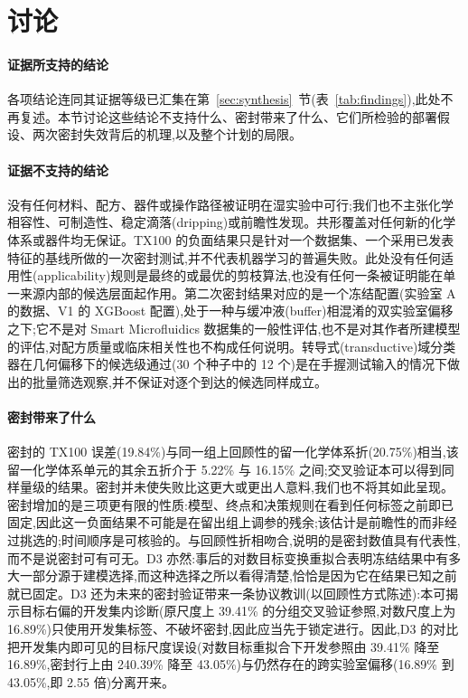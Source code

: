 \documentclass[11pt,a4paper]{ctexart}
\begin{document}
\section{讨论}
\label{sec:discussion}

\paragraph{证据所支持的结论} 各项结论连同其证据等级已汇集在第~\ref{sec:synthesis}~节(表~\ref{tab:findings}),此处不再复述。本节讨论这些结论不支持什么、密封带来了什么、它们所检验的部署假设、两次密封失效背后的机理,以及整个计划的局限。

\paragraph{证据不支持的结论} 没有任何材料、配方、器件或操作路径被证明在湿实验中可行;我们也不主张化学相容性、可制造性、稳定滴落(dripping)或前瞻性发现。共形覆盖对任何新的化学体系或器件均无保证。TX100 的负面结果只是针对一个数据集、一个采用已发表特征的基线所做的一次密封测试,并不代表机器学习的普遍失败。此处没有任何适用性(applicability)规则是最终的或最优的剪枝算法,也没有任何一条被证明能在单一来源内部的候选层面起作用。第二次密封结果对应的是一个冻结配置(实验室 A 的数据、V1 的 XGBoost 配置),处于一种与缓冲液(buffer)相混淆的双实验室偏移之下;它不是对 Smart Microfluidics 数据集的一般性评估,也不是对其作者所建模型的评估,对配方质量或临床相关性也不构成任何说明。转导式(transductive)域分类器在几何偏移下的候选级通过(30 个种子中的 12 个)是在手握测试输入的情况下做出的批量筛选观察,并不保证对逐个到达的候选同样成立。

\paragraph{密封带来了什么} 密封的 TX100 误差(19.84\%)与同一组上回顾性的留一化学体系折(20.75\%)相当,该留一化学体系单元的其余五折介于 5.22\% 与 16.15\% 之间;交叉验证本可以得到同样量级的结果。密封并未使失败比这更大或更出人意料,我们也不将其如此呈现。密封增加的是三项更有限的性质:模型、终点和决策规则在看到任何标签之前即已固定,因此这一负面结果不可能是在留出组上调参的残余;该估计是前瞻性的而非经过挑选的;时间顺序是可核验的。与回顾性折相吻合,说明的是密封数值具有代表性,而不是说密封可有可无。D3 亦然:事后的对数目标变换重拟合表明冻结结果中有多大一部分源于建模选择,而这种选择之所以看得清楚,恰恰是因为它在结果已知之前就已固定。D3 还为未来的密封验证带来一条协议教训(以回顾性方式陈述):本可揭示目标右偏的开发集内诊断(原尺度上 39.41\% 的分组交叉验证参照,对数尺度上为 16.89\%)只使用开发集标签、不破坏密封,因此应当先于锁定进行。因此,D3 的对比把开发集内即可见的目标尺度误设(对数目标重拟合下开发参照由 39.41\% 降至 16.89\%,密封行上由 240.39\% 降至 43.05\%)与仍然存在的跨实验室偏移(16.89\% 到 43.05\%,即 2.55 倍)分离开来。
\end{document}
